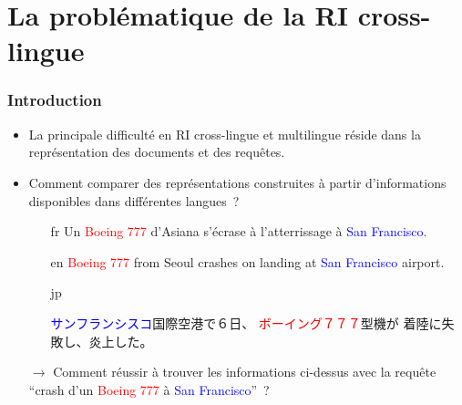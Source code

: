 \documentclass[11pt,aspectratio=43,dvipsnames,table]{beamer}
\begin{document}
\section{La problématique de la RI cross-lingue}


\begin{frame}
    \frametitle{Introduction}
    \begin{itemize} \itemsep10pt
        \item La principale difficulté en RI cross-lingue et multilingue réside 
              dans la représentation des documents et des requêtes.
        \item Comment comparer des représentations construites à partir 
              d'informations disponibles dans différentes langues~?

        \begin{itemize} 
          \item[fr] Un \textcolor<2>{red}{Boeing 777} d'Asiana 
                    s'\textcolor<2>{JungleGreen}{écrase} à l'atterrissage à 
                    \textcolor<2>{blue}{San Francisco}.
          \item[en] \textcolor<2>{red}{Boeing 777} from Seoul 
                    \textcolor<2>{JungleGreen}{crashes} on landing at 
                    \textcolor<2>{blue}{San Francisco} airport.
          \item[jp] \begin{CJK*}{UTF8}{min}
                    \textcolor<2>{blue}{サンフランシスコ}国際空港で６日、
                    \textcolor<2>{red}{ボーイング７７７}型機が
                    \textcolor<2>{JungleGreen}{着陸に失敗し}、炎上した。
                    \end{CJK*}
        \end{itemize}
        \item[$\to$] Comment réussir à trouver les informations ci-dessus avec 
                     la requête ``\textcolor<2>{JungleGreen}{crash} d'un 
                     \textcolor<2>{red}{Boeing 777} à 
                     \textcolor<2>{blue}{San Francisco}''~?
    \end{itemize}
\end{frame}
\end{document}
